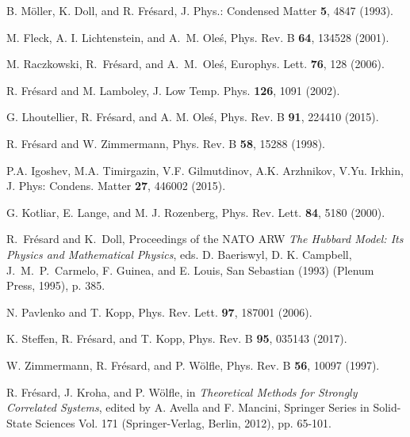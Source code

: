 \documentclass[showpacs,amsmath,twocolumn,floatfix]{revtex4-1}
\begin{document}
\begin{thebibliography}{0}
 B. M\"oller, K. Doll, and R. Fr\'esard,
                    J. Phys.: Condensed Matter \textbf{5}, 4847 (1993).


 M. Fleck, A. I. Lichtenstein, and A.~M. Ole\'s,
                    Phys. Rev. B \textbf{64}, 134528 (2001).

 M. Raczkowski, R.~Fr\'esard, and A.~M.~Ole\'s,
                    Europhys. Lett. \textbf{76}, 128 (2006).
                    
 R. Fr\'esard and M. Lamboley, 
                    J. Low Temp. Phys. \textbf{126}, 1091 (2002). 
                    
 G. Lhoutellier, R. Fr\'esard, and A. M. Ole\'s, 
                        Phys. Rev. B {\bf 91}, 224410 (2015). 
                        
 R. Fr\'esard and W. Zimmermann, 
                   Phys. Rev. B \textbf{58}, 15288 (1998).

 P.A. Igoshev, M.A. Timirgazin, V.F. Gilmutdinov,
                A.K. Arzhnikov, V.Yu. Irkhin,
                   J. Phys: Condens. Matter \textbf{27}, 446002 (2015).

 G. Kotliar, E. Lange, and M. J. Rozenberg,
                    Phys. Rev. Lett. \textbf{84}, 5180 (2000).

 R.~Fr\'esard and K.~Doll, Proceedings of the NATO ARW
                    \textit{The Hubbard Model: Its Physics and
                    Mathematical Physics}, eds. D. Baeriswyl, D. K. Campbell,
                    J.~M.~P.~Carmelo, F. Guinea, and E. Louis,
                    San Sebastian (1993) (Plenum Press, 1995), p. 385.

 N. Pavlenko and T. Kopp,
                   Phys. Rev. Lett. \textbf{97}, 187001 (2006).

 K. Steffen, R. Fr\'esard, and T. Kopp, 
                   Phys. Rev. B \textbf{95}, 035143 (2017).                   

 W. Zimmermann, R. Fr\'esard, and P. W\"olfle,
                    Phys. Rev. B \textbf{56}, 10097 (1997).

 R. Fr\'esard, J. Kroha, and P. W\"olfle, 
in {\it Theoretical Methods for Strongly Correlated Systems}, 
edited by A. Avella and F. Mancini, 
Springer Series in Solid-State Sciences Vol. 171 
(Springer-Verlag, Berlin, 2012), pp. 65-101.


\end{thebibliography}
\end{document}
